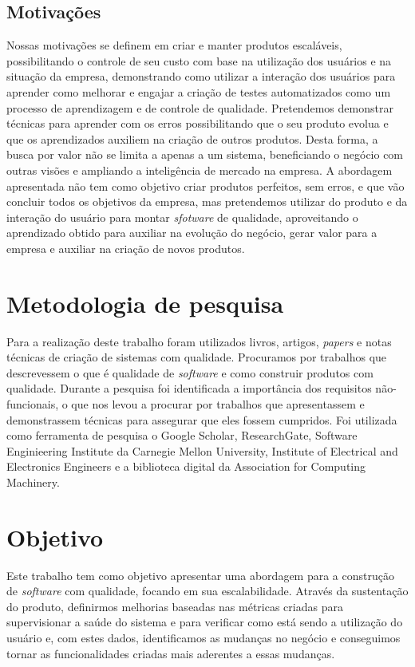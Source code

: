     \subsection{Motivações}
      Nossas motivações se definem em criar e manter produtos escaláveis,
      possibilitando o controle de seu custo com base na utilização
      dos usuários e na situação da empresa, demonstrando como utilizar a interação
      dos usuários para aprender como melhorar e engajar a criação de testes
      automatizados como um processo de aprendizagem e de controle de qualidade. \newline
      Pretendemos demonstrar técnicas para aprender com os erros possibilitando
      que o seu produto evolua e que os aprendizados auxiliem na criação de outros
      produtos. Desta forma, a busca por valor não se limita a apenas a um sistema,
      beneficiando o negócio com outras visões e ampliando a inteligência de mercado
      na empresa. A abordagem apresentada não tem como objetivo criar produtos perfeitos,
      sem erros, e que vão concluir todos os objetivos da empresa, mas pretendemos
      utilizar do produto e da interação do usuário para montar \textit{sfotware}
      de qualidade, aproveitando o aprendizado obtido para auxiliar na evolução
      do negócio, gerar valor para a empresa e auxiliar na criação de novos produtos.

  \section{Metodologia de pesquisa}
    Para a realização deste trabalho foram utilizados livros, artigos, \textit{papers}
    e notas técnicas de criação de sistemas com qualidade. Procuramos por trabalhos
    que descrevessem o que é qualidade de \textit{software} e como construir
    produtos com qualidade. Durante a pesquisa foi identificada a importância dos
    requisitos não-funcionais, o que nos levou a procurar por trabalhos que
    apresentassem e demonstrassem técnicas para assegurar que eles fossem
    cumpridos. \newline
    Foi utilizada como ferramenta de pesquisa o Google Scholar, ResearchGate,
    Software Enginieering Institute da Carnegie Mellon University, Institute of
    Electrical and Electronics Engineers e a biblioteca digital da Association
    for Computing Machinery.

  \section{Objetivo}
    Este trabalho tem como objetivo apresentar uma abordagem para a construção de
    \textit{software} com qualidade, focando em sua escalabilidade. Através da
    sustentação do produto, definirmos melhorias baseadas nas métricas criadas
    para supervisionar a saúde do sistema e para verificar como está sendo a
    utilização do usuário e, com estes dados, identificamos as mudanças no negócio
    e conseguimos tornar as funcionalidades criadas mais aderentes a essas mudanças.

